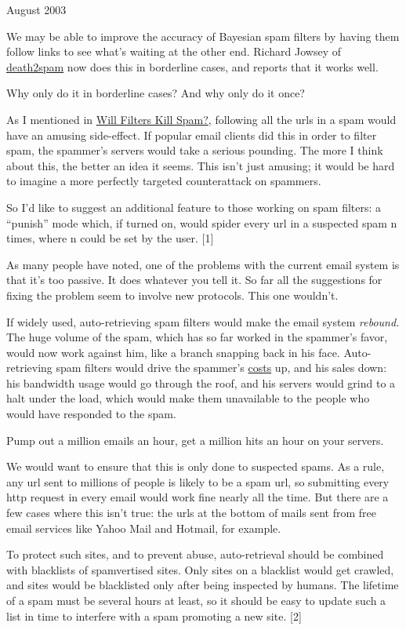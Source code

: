 August 2003

We may be able to improve the accuracy of Bayesian spam filters by
having them follow links to see what's waiting at the other end. Richard
Jowsey of \href{http://death2spam.com}{death2spam} now does this in
borderline cases, and reports that it works well.

Why only do it in borderline cases? And why only do it once?

As I mentioned in \href{wfks.html}{Will Filters Kill Spam?}, following
all the urls in a spam would have an amusing side-effect. If popular
email clients did this in order to filter spam, the spammer's servers
would take a serious pounding. The more I think about this, the better
an idea it seems. This isn't just amusing; it would be hard to imagine a
more perfectly targeted counterattack on spammers.

So I'd like to suggest an additional feature to those working on spam
filters: a ``punish'' mode which, if turned on, would spider every url
in a suspected spam n times, where n could be set by the user. {[}1{]}

As many people have noted, one of the problems with the current email
system is that it's too passive. It does whatever you tell it. So far
all the suggestions for fixing the problem seem to involve new
protocols. This one wouldn't.

If widely used, auto-retrieving spam filters would make the email system
\emph{rebound.} The huge volume of the spam, which has so far worked in
the spammer's favor, would now work against him, like a branch snapping
back in his face. Auto-retrieving spam filters would drive the spammer's
\href{http://www.bork.ca/pics/?path=incoming&img=bill.jpg}{costs} up,
and his sales down: his bandwidth usage would go through the roof, and
his servers would grind to a halt under the load, which would make them
unavailable to the people who would have responded to the spam.

Pump out a million emails an hour, get a million hits an hour on your
servers.

We would want to ensure that this is only done to suspected spams. As a
rule, any url sent to millions of people is likely to be a spam url, so
submitting every http request in every email would work fine nearly all
the time. But there are a few cases where this isn't true: the urls at
the bottom of mails sent from free email services like Yahoo Mail and
Hotmail, for example.

To protect such sites, and to prevent abuse, auto-retrieval should be
combined with blacklists of spamvertised sites. Only sites on a
blacklist would get crawled, and sites would be blacklisted only after
being inspected by humans. The lifetime of a spam must be several hours
at least, so it should be easy to update such a list in time to
interfere with a spam promoting a new site. {[}2{]}

